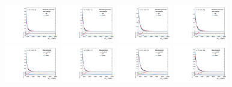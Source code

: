 \begin{figure}[htbp]
  \centering
  \includegraphics[width=0.21\textwidth]{fig/uncertainties/systs_nonRes_e_HP_nobb_LDy_MVVScale_ProjX.pdf}
  \includegraphics[width=0.21\textwidth]{fig/uncertainties/systs_nonRes_e_LP_nobb_LDy_MVVScale_ProjX.pdf}
  \includegraphics[width=0.21\textwidth]{fig/uncertainties/systs_nonRes_e_HP_nobb_HDy_MVVScale_ProjX.pdf}
  \includegraphics[width=0.21\textwidth]{fig/uncertainties/systs_nonRes_e_LP_nobb_HDy_MVVScale_ProjX.pdf}\\
  \includegraphics[width=0.21\textwidth]{fig/uncertainties/systs_nonRes_e_HP_nobb_LDy_Diag_ProjX.pdf}
  \includegraphics[width=0.21\textwidth]{fig/uncertainties/systs_nonRes_e_LP_nobb_LDy_Diag_ProjX.pdf}
  \includegraphics[width=0.21\textwidth]{fig/uncertainties/systs_nonRes_e_HP_nobb_HDy_Diag_ProjX.pdf}
  \includegraphics[width=0.21\textwidth]{fig/uncertainties/systs_nonRes_e_LP_nobb_HDy_Diag_ProjX.pdf}\\

\end{figure}
